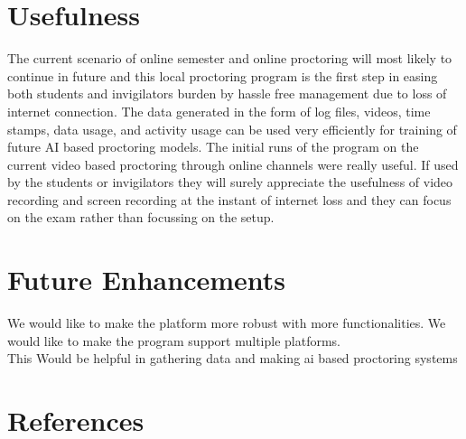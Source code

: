 \documentclass{article}
\begin{document}
\section{Usefulness}
The current scenario of online semester and online proctoring will most likely to continue in future and this local proctoring program is the first step in easing both students and invigilators burden by hassle free management due to loss of internet connection. The data generated in the form of log files, videos, time stamps, data usage, and activity usage can be used very efficiently for training of future AI based proctoring models. The initial runs of the program on the current video based proctoring through online channels were really useful. If used by the students or invigilators they will surely appreciate the usefulness of video recording and screen recording at the instant of internet loss and they can focus on the exam rather than focussing on the setup.
\section{Future Enhancements}
We would like to make the platform more robust with more functionalities. We would like to make the program support multiple platforms.\\
This Would be helpful in gathering data and making ai based proctoring systems


\section{References}
\end{document}
